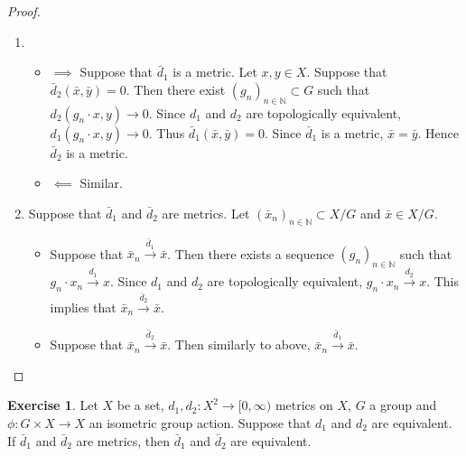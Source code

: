 \documentclass[12pt]{amsart}
\theoremstyle{definition}
\newtheorem{ex}[definition]{Exercise}
\newcommand{\N}{\mathbb{N}}
\newcommand{\Rg}{[0,\infty)}
\newcommand{\conv}[1]{\xrightarrow{#1}}
\DeclareMathOperator*{\0}{\mbf{0}}
\DeclareMathOperator*{\1}{\mbf{1}}
\newcommand{\lex}[1]{\label{ex:#1}}
\begin{document}
	\begin{proof}\
	\begin{enumerate}
	\item 
	\begin{itemize}
	\item $\implies$ Suppose that $\bar{d}_1$ is a metric. Let $x,y \in X$. Suppose that $\bar{d}_2(\bar{x}, \bar{y}) = 0$. Then there exist $(g_n)_{n \in \N} \subset G$ such that $d_2(g_n \cdot x, y) \rightarrow 0$. Since $d_1$ and $d_2$ are topologically equivalent, $d_1(g_n \cdot x, y) \rightarrow 0$. Thus $\bar{d}_1(\bar{x}, \bar{y}) = 0$. Since $\bar{d}_1$ is a metric, $\bar{x} = \bar{y}$. Hence $\bar{d}_2$ is a metric. 
	\item $\impliedby$ Similar.
	\end{itemize}
	\item Suppose that $\bar{d}_1$ and $\bar{d}_2$ are metrics. Let $(\bar{x}_n)_{n \in \N} \subset X/G$ and $\bar{x} \in X/G$. 
	\begin{itemize}
	\item Suppose that $\bar{x}_n \conv{\bar{d}_1} \bar{x}$. Then there exists a sequence $(g_n)_{n \in \N}$ such that $g_n \cdot x_n \conv{d_1} x$. Since $d_1$ and $d_2$ are topologically equivalent, $g_n \cdot x_n \conv{d_2} x$. This implies that $\bar{x}_n \conv{\bar{d}_2} \bar{x}$. 
	\item Suppose that $\bar{x}_n \conv{\bar{d}_2} \bar{x}$. Then similarly to above, $\bar{x}_n \conv{\bar{d}_1} \bar{x}$.
	\end{itemize}
	\end{enumerate}
	\end{proof}	
	
	\begin{ex} \lex{}
	Let $X$ be a set, $d_1, d_2: X^2 \rightarrow \Rg$ metrics on $X$, $G$ a group and $\phi: G \times X \rightarrow X$ an isometric group action. Suppose that $d_1$ and $d_2$ are equivalent. If $\bar{d}_1$ and $\bar{d}_2$ are metrics, then $\bar{d}_1$ and $\bar{d}_2$ are equivalent.
	\end{ex}
	
\end{document}

